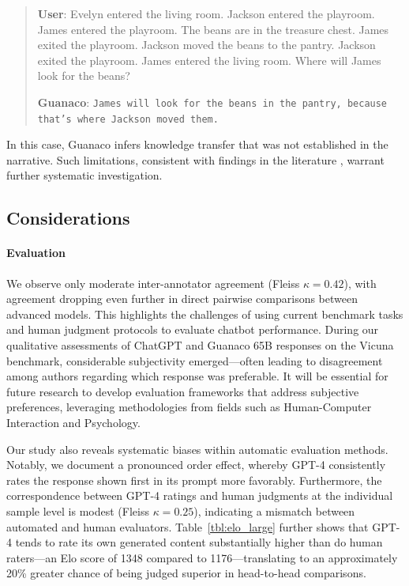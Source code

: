 \begin{quote}
    \textbf{User}: Evelyn entered the living room. Jackson entered the playroom. James entered the playroom. The beans are in the treasure chest. James exited the playroom. Jackson moved the beans to the pantry. Jackson exited the playroom. James entered the living room. Where will James look for the beans?

    \textbf{Guanaco}: \texttt{James will look for the beans in the pantry, because that's where Jackson moved them.}
\end{quote}

In this case, {Guanaco} infers knowledge transfer that was not established in the narrative. Such limitations, consistent with findings in the literature \cite{sap2022neural}, warrant further systematic investigation.

\subsection{Considerations}
\label{ssec:considerations}

\paragraph{Evaluation}

We observe only moderate inter-annotator agreement (Fleiss $\kappa=0.42$), with agreement dropping even further in direct pairwise comparisons between advanced models. This highlights the challenges of using current benchmark tasks and human judgment protocols to evaluate chatbot performance. During our qualitative assessments of ChatGPT and {Guanaco} 65B responses on the Vicuna benchmark, considerable subjectivity emerged—often leading to disagreement among authors regarding which response was preferable. It will be essential for future research to develop evaluation frameworks that address subjective preferences, leveraging methodologies from fields such as Human-Computer Interaction and Psychology.

Our study also reveals systematic biases within automatic evaluation methods. Notably, we document a pronounced order effect, whereby GPT-4 consistently rates the response shown first in its prompt more favorably. Furthermore, the correspondence between GPT-4 ratings and human judgments at the individual sample level is modest (Fleiss $\kappa=0.25$), indicating a mismatch between automated and human evaluators. Table~\ref{tbl:elo_large} further shows that GPT-4 tends to rate its own generated content substantially higher than do human raters—an Elo score of 1348 compared to 1176—translating to an approximately 20\% greater chance of being judged superior in head-to-head comparisons.

